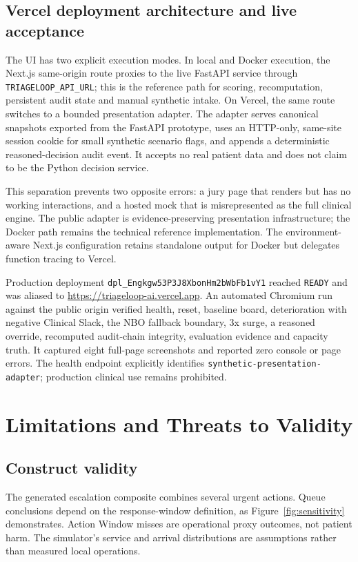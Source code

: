 \documentclass[11pt,a4paper]{article}
\newcommand{\code}[1]{\nolinkurl{#1}}
\begin{document}
\subsection{Vercel deployment architecture and live acceptance}

The UI has two explicit execution modes. In local and Docker execution, the Next.js same-origin route proxies to the live FastAPI service through \code{TRIAGELOOP\_API\_URL}; this is the reference path for scoring, recomputation, persistent audit state and manual synthetic intake. On Vercel, the same route switches to a bounded presentation adapter. The adapter serves canonical snapshots exported from the FastAPI prototype, uses an HTTP-only, same-site session cookie for small synthetic scenario flags, and appends a deterministic reasoned-decision audit event. It accepts no real patient data and does not claim to be the Python decision service.

This separation prevents two opposite errors: a jury page that renders but has no working interactions, and a hosted mock that is misrepresented as the full clinical engine. The public adapter is evidence-preserving presentation infrastructure; the Docker path remains the technical reference implementation. The environment-aware Next.js configuration retains standalone output for Docker but delegates function tracing to Vercel.

Production deployment \code{dpl\_Engkgw53P3J8XbonHm2bWbFb1vY1} reached \code{READY} and was aliased to \url{https://triageloop-ai.vercel.app}. An automated Chromium run against the public origin verified health, reset, baseline board, deterioration with negative Clinical Slack, the NBO fallback boundary, 3x surge, a reasoned override, recomputed audit-chain integrity, evaluation evidence and capacity truth. It captured eight full-page screenshots and reported zero console or page errors. The health endpoint explicitly identifies \code{synthetic-presentation-adapter}; production clinical use remains prohibited.

\section{Limitations and Threats to Validity}

\subsection{Construct validity}

The generated escalation composite combines several urgent actions. Queue conclusions depend on the response-window definition, as Figure~\ref{fig:sensitivity} demonstrates. Action Window misses are operational proxy outcomes, not patient harm. The simulator's service and arrival distributions are assumptions rather than measured local operations.
\end{document}
